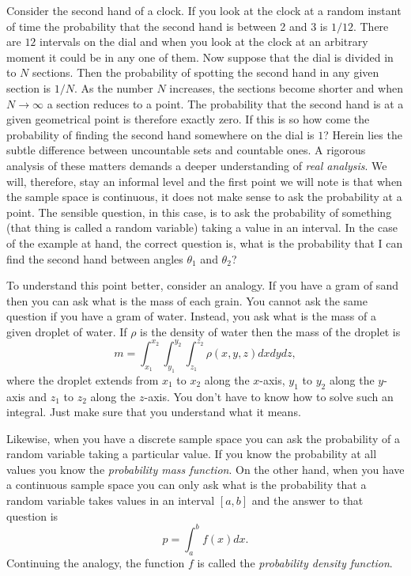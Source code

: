 \documentclass{article}
\begin{document}
Consider the second hand of a clock. If you look at the clock at a random
instant of time the probability that the second hand is between 2 and 3
is $1/12$. There are $12$ intervals on the dial and when you look at the 
clock at an arbitrary moment it could be in any one of them. Now suppose 
that the dial is divided in to $N$ sections. Then the probability of 
spotting the second hand in any given section is $1/N$. As the number $N$
increases, the sections become shorter and when $N \rightarrow \infty$ a
section reduces to a point. The probability that the second hand is at a
given geometrical point is therefore exactly zero. If this is so how come
the probability of finding the second hand somewhere on the dial is $1$?
Herein lies the subtle difference between uncountable sets and countable
ones. A rigorous analysis of these matters demands a deeper understanding
of \emph{real analysis}. We will, therefore, stay an informal level and 
the first point we will note is that when the sample space is continuous,
it does not make sense to ask the probability at a point. The sensible 
question, in this case, is to ask the probability of something (that thing
is called a random variable) taking a value in an interval. In the case of
the example at hand, the correct question is, what is the probability that
I can find the second hand between angles $\theta_1$ and $\theta_2$?

To understand this point better, consider an analogy. If you have a gram 
of sand then you can ask what is the mass of each grain. You cannot ask 
the same question if you have a gram of water. Instead, you ask what is the
mass of a given droplet of water. If $\rho$ is the density of water then
the mass of the droplet is
\begin{equation}\label{e14}
m = \int_{x_1}^{x_2}\int_{y_1}^{y_2}\int_{z_1}^{z_2}\rho(x, y, z)dxdydz,
\end{equation}
where the droplet extends from $x_1$ to $x_2$ along the $x$-axis, $y_1$
to $y_2$ along the $y$-axis and $z_1$ to $z_2$ along the $z$-axis. You 
don't have to know how to solve such an integral. Just make sure that you
understand what it means.

Likewise, when you have a discrete sample space you can ask the probability
of a random variable taking a particular value. If you know the probability
at all values you know the \emph{probability mass function}. On the other
hand, when you have a continuous sample space you can only ask what is
the probability that a random variable takes values in an interval $[a, b]$
and the answer to that question is
\begin{equation}\label{e15}
p = \int_a^b f(x)dx.
\end{equation}
Continuing the analogy, the function $f$ is called the \emph{probability
density function}.
\end{document}
